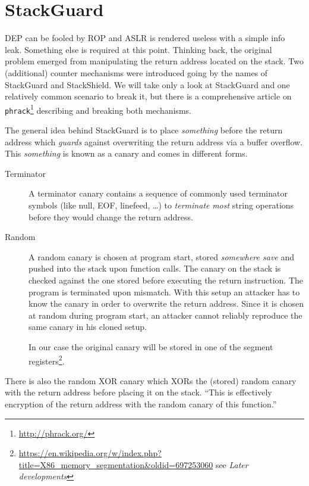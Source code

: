 \documentclass[article]{uibk}
\begin{document}
\section{StackGuard}

DEP can be fooled by ROP and ASLR is rendered useless with a simple info leak.
Something else is required at this point. Thinking back, the original problem
emerged from manipulating the return address located on the stack. Two
(additional) counter mechanisms were introduced going by the names of
StackGuard and StackShield. We will take only a look at StackGuard and one
relatively common scenario to break it, but there is a comprehensive article
\cite{phrack_stack_guard} on \texttt{phrack}\footnote{\url{http://phrack.org/}}
describing and breaking both mechanisms.

The general idea behind StackGuard is to place \emph{something} before the
return address which \emph{guards} against overwriting the return address via a
buffer overflow. This \emph{something} is known as a canary and comes in
different forms.

\begin{description}
    \item[Terminator] A terminator canary contains a sequence of commonly used
        terminator symbols (like null, EOF, linefeed, \dots) to
        \emph{terminate} \emph{most} string operations before they would change
        the return address.

    \item[Random] A random canary is chosen at program start, stored
        \textit{somewhere save} and pushed into the stack upon function calls.
        The canary on the stack is checked against the one stored before
        executing the return instruction. The program is terminated upon
        mismatch. With this setup an attacker has to know the canary in order
        to overwrite the return address. Since it is chosen at random during
        program start, an attacker cannot reliably reproduce the same canary in
        his cloned setup.

        In our case the original canary will be stored in one of the segment
        registers\footnote{\url{https://en.wikipedia.org/w/index.php?title=X86_memory_segmentation&oldid=697253060}
        see \textit{Later developments}}.
\end{description}

There is also the random XOR canary which XORs the (stored) random canary with
the return address before placing it on the stack. ``This is effectively
encryption of the return address with the random canary of this
function.''~\cite{phrack_stack_guard}
\end{document}
